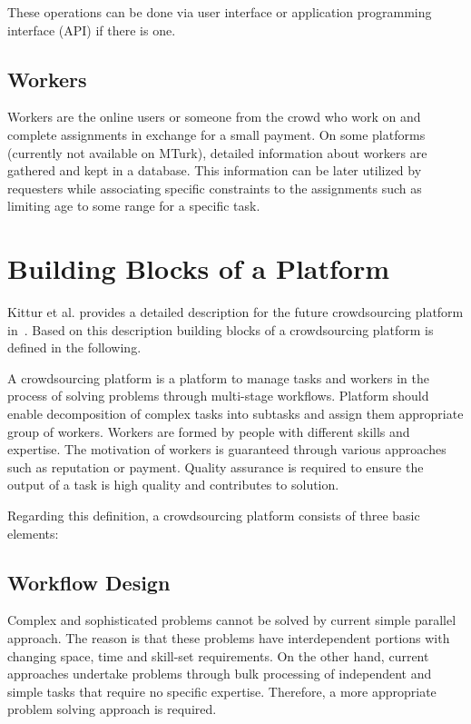 These operations can be done via user interface or application programming 
interface (API) if there is one. 

\subsection{Workers}
Workers are the online users or someone from the crowd who work on and 
complete assignments in exchange for a small payment. On some platforms 
(currently not available on MTurk), detailed information about workers are gathered 
and kept in a database. This information can be later utilized by requesters while 
associating specific constraints to the assignments such as limiting age to some 
range for a specific task. 



\section{Building Blocks of a Platform}
Kittur et al. provides a detailed description for the future crowdsourcing platform 
in~\cite{Kittur2013}. Based on this description building blocks of a crowdsourcing 
platform is defined in the following.

A crowdsourcing platform is a platform to manage tasks and workers in the 
process of solving problems through multi-stage workflows. Platform should enable 
decomposition of complex tasks into subtasks and assign them appropriate group of 
workers. Workers are formed by people with different skills and expertise. The motivation 
of workers is guaranteed through various approaches 
such as reputation or payment. Quality assurance is required to ensure the output 
of a task is high quality and contributes to solution.

Regarding this definition, a crowdsourcing platform consists of three basic elements:

\subsection{Workflow Design}
Complex and sophisticated problems cannot be solved by current simple parallel 
approach. The reason is that these problems have interdependent portions with 
changing space, time and skill-set requirements. On the other hand, current 
approaches undertake problems through bulk processing of independent 
and simple tasks that require no specific expertise. Therefore, a more appropriate 
problem solving approach is required.

